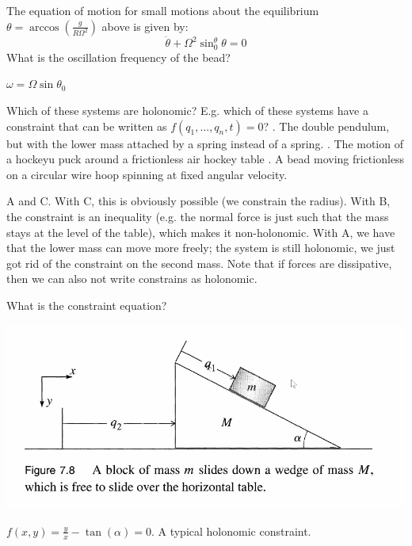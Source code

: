 \begin{p}
The equation of motion for small motions about the equilibrium $\theta = \arccos(\frac{g}{R\Omega^2})$ above is given by:
\[\ddot{\theta} +\Omega^2\sin^\theta_0\theta = 0\]
What is the oscillation frequency of the bead?
\end{p}
\begin{s}
$\omega = \Omega\sin\theta_0$
\end{s}

\begin{p}
Which of these systems are holonomic? E.g. which of these systems have a constraint that can be written as $f(q_1, \ldots, q_n, t) = 0$?
. The double pendulum, but with the lower mass attached by a spring instead of a spring.
. The motion of a hockeyu puck around a frictionless air hockey table
. A bead moving frictionless on a circular wire hoop spinning at fixed angular velocity.
\end{p}
\begin{s}
A and C. With C, this is obviously possible (we constrain the radius). With B, the constraint is an inequality (e.g. the normal force is just such that the mass stays at the level of the table), which makes it non-holonomic. With A, we have that the lower mass can move more freely; the system is still holonomic, we just got rid of the constraint on the second mass. Note that if forces are dissipative, then we can also not write constrains as holonomic.
\end{s}

\begin{p}
What is the constraint equation?
\begin{center}
    \includegraphics[scale=0.75]{Lecture-13/w13-img1.png}
\end{center}
\end{p}
\begin{s}
$f(x,y) = \frac{y}{x} - \tan(\alpha) = 0$. A typical holonomic constraint.
\end{s}

